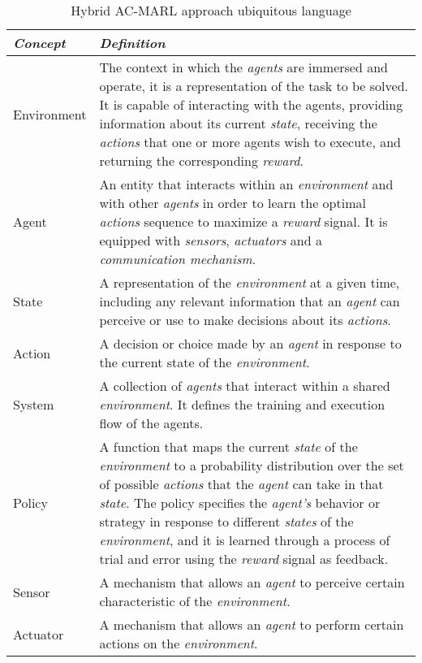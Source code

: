 \begin{table}
    \centering
    \begin{tabularx}{\textwidth}{lX}
        \hline
        \textbf{\emph{Concept}} & \textbf{\emph{Definition}} \\
        \hline
        Environment & The context in which the \emph{agents} are immersed and operate,
                        it is a representation of the task to be solved.
                        It is capable of interacting with the agents, providing information
                        about its current \emph{state}, receiving the \emph{actions} that one or more agents
                        wish to execute, and returning the corresponding \emph{reward}. \\
        \hline
        Agent       & An entity that interacts within an \emph{environment} and with other \emph{agents}
                        in order to learn the optimal \emph{actions} sequence to maximize a \emph{reward} signal. 
                        It is equipped with \emph{sensors}, \emph{actuators} and a \emph{communication mechanism}. \\
        \hline
        State       & A representation of the \emph{environment} at a given time, 
                        including any relevant information that an \emph{agent} can perceive 
                        or use to make decisions about its \emph{actions}. \\
        \hline
        Action      & A decision or choice made by an \emph{agent} in response to the current 
                        state of the \emph{environment}. \\
        \hline
        System      & A collection of \emph{agents} that interact within a shared \emph{environment}. 
                        It defines the training and execution flow of the agents. \\
        \hline
        Policy      & A function that maps the current \emph{state} of the \emph{environment} to a probability 
                        distribution over the set of possible \emph{actions} that the \emph{agent} 
                        can take in that \emph{state}. The policy specifies the \emph{agent's} behavior 
                        or strategy in response to different \emph{states} of the \emph{environment}, 
                        and it is learned through a process of trial and error using the 
                        \emph{reward} signal as feedback. \\
        \hline
        Sensor     & A mechanism that allows an \emph{agent} to perceive certain characteristic of 
                            the \emph{environment}. \\
        \hline
        Actuator   & A mechanism that allows an \emph{agent} to perform certain actions on the 
                            \emph{environment}. \\
        \hline
    \end{tabularx}
    \caption{Hybrid AC-MARL approach ubiquitous language}
    \label{tab:ul}
\end{table}
